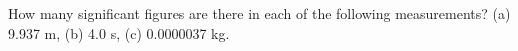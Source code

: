 How many significant figures are there in each of the following measurements?
        (a) 9.937 m, (b) 4.0 s, (c) 0.0000037 kg.
